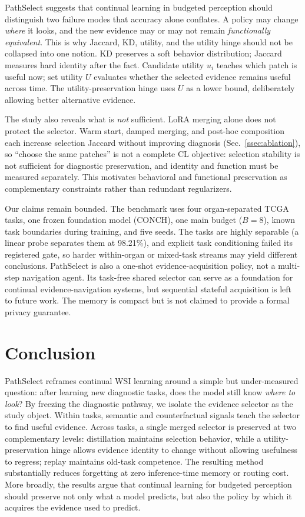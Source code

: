 \documentclass{article}
\begin{document}
PathSelect suggests that continual learning in budgeted perception should distinguish two failure modes that accuracy alone conflates.
A policy may change \emph{where} it looks, and the new evidence may or may not remain \emph{functionally equivalent}.
This is why Jaccard, KD, utility, and the utility hinge should not be collapsed into one notion.
KD preserves a soft behavior distribution; Jaccard measures hard identity after the fact.
Candidate utility $u_i$ teaches which patch is useful now; set utility $U$ evaluates whether the selected evidence remains useful across time.
The utility-preservation hinge uses $U$ as a lower bound, deliberately allowing better alternative evidence.

The study also reveals what is \emph{not} sufficient.
LoRA merging alone does not protect the selector.
Warm start, damped merging, and post-hoc composition each increase selection Jaccard without improving diagnosis (Sec.~\ref{ssec:ablation}), so ``choose the same patches'' is not a complete CL objective: selection stability is not sufficient for diagnostic preservation, and identity and function must be measured separately.
This motivates behavioral and functional preservation as complementary constraints rather than redundant regularizers.

Our claims remain bounded.
The benchmark uses four organ-separated TCGA tasks, one frozen foundation model (CONCH), one main budget ($B=8$), known task boundaries during training, and five seeds.
The tasks are highly separable (a linear probe separates them at 98.21\%), and explicit task conditioning failed its registered gate, so harder within-organ or mixed-task streams may yield different conclusions.
PathSelect is also a one-shot evidence-acquisition policy, not a multi-step navigation agent.
Its task-free shared selector can serve as a foundation for continual evidence-navigation systems, but sequential stateful acquisition is left to future work. The memory is compact but is not claimed to provide a formal privacy guarantee.

\section{Conclusion}

PathSelect reframes continual WSI learning around a simple but under-measured question: after learning new diagnostic tasks, does the model still know \emph{where to look}?
By freezing the diagnostic pathway, we isolate the evidence selector as the study object.
Within tasks, semantic and counterfactual signals teach the selector to find useful evidence.
Across tasks, a single merged selector is preserved at two complementary levels: distillation maintains selection behavior, while a utility-preservation hinge allows evidence identity to change without allowing usefulness to regress; replay maintains old-task competence.
The resulting method substantially reduces forgetting at zero inference-time memory or routing cost.
More broadly, the results argue that continual learning for budgeted perception should preserve not only what a model predicts, but also the policy by which it acquires the evidence used to predict.



\end{document}
